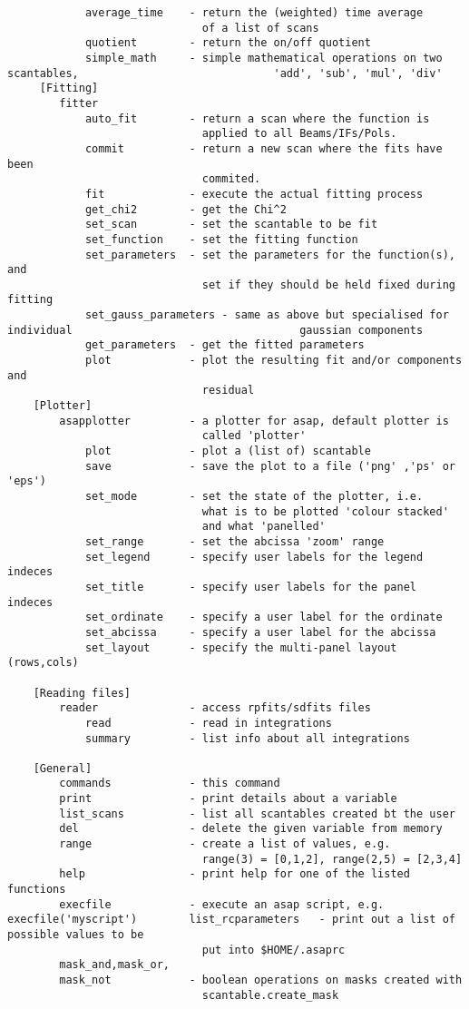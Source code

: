 \documentclass[11pt]{article}
\begin{document}
\begin{verbatim}
            average_time    - return the (weighted) time average
                              of a list of scans
            quotient        - return the on/off quotient
            simple_math     - simple mathematical operations on two scantables,                              'add', 'sub', 'mul', 'div'
     [Fitting]
        fitter
            auto_fit        - return a scan where the function is
                              applied to all Beams/IFs/Pols.
            commit          - return a new scan where the fits have been
                              commited.
            fit             - execute the actual fitting process
            get_chi2        - get the Chi^2
            set_scan        - set the scantable to be fit
            set_function    - set the fitting function
            set_parameters  - set the parameters for the function(s), and
                              set if they should be held fixed during fitting
            set_gauss_parameters - same as above but specialised for individual                                   gaussian components
            get_parameters  - get the fitted parameters
            plot            - plot the resulting fit and/or components and
                              residual
    [Plotter]
        asapplotter         - a plotter for asap, default plotter is
                              called 'plotter'
            plot            - plot a (list of) scantable
            save            - save the plot to a file ('png' ,'ps' or 'eps')
            set_mode        - set the state of the plotter, i.e.
                              what is to be plotted 'colour stacked'
                              and what 'panelled'
            set_range       - set the abcissa 'zoom' range
            set_legend      - specify user labels for the legend indeces
            set_title       - specify user labels for the panel indeces
            set_ordinate    - specify a user label for the ordinate
            set_abcissa     - specify a user label for the abcissa
            set_layout      - specify the multi-panel layout (rows,cols)

    [Reading files]
        reader              - access rpfits/sdfits files
            read            - read in integrations
            summary         - list info about all integrations

    [General]
        commands            - this command
        print               - print details about a variable
        list_scans          - list all scantables created bt the user
        del                 - delete the given variable from memory
        range               - create a list of values, e.g.
                              range(3) = [0,1,2], range(2,5) = [2,3,4]
        help                - print help for one of the listed functions
        execfile            - execute an asap script, e.g. execfile('myscript')        list_rcparameters   - print out a list of possible values to be
                              put into $HOME/.asaprc
        mask_and,mask_or,
        mask_not            - boolean operations on masks created with
                              scantable.create_mask


\end{verbatim}
\end{document}
